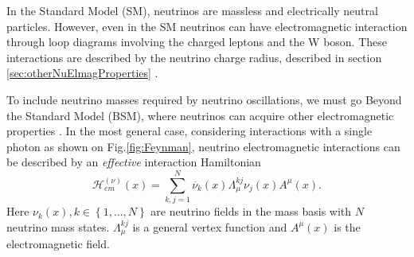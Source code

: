 
In the Standard Model (SM), neutrinos are massless and electrically neutral particles. However, even in the SM neutrinos can have electromagnetic interaction through loop diagrams involving the charged leptons and the W boson. These interactions are described by the neutrino charge radius, described in section \ref{sec:otherNuElmagProperties} \cite{NeutrinoPropertiesSnowmass2022.pdf}.


To include neutrino masses required by neutrino oscillations, we must go Beyond the Standard Model (BSM), where neutrinos can acquire other electromagnetic properties \cite{nuElmagInt2015.pdf}. In the most general case, considering interactions with a single photon as shown on Fig.\ref{fig:Feynman}, neutrino electromagnetic interactions can be described by an \textit{effective} interaction Hamiltonian \cite{nuElmagInt2015.pdf}
\begin{equation}
\mathcal{H}^{\left(\nu\right)}_{em}\left(x\right)=\sum^N_{k,j=1}\overline{\nu}_k\left(x\right)\Lambda^{kj}_{\mu}\nu_j\left(x\right)A^{\mu}\left(x\right).
\end{equation}
Here $\nu_k\left(x\right), k\in\left\lbrace 1,...,N\right\rbrace$ are neutrino fields in the mass basis with $N$ neutrino mass states. $\Lambda^{kj}_{\mu}$ is a general vertex function and $A^{\mu}\left(x\right)$ is the electromagnetic field.

